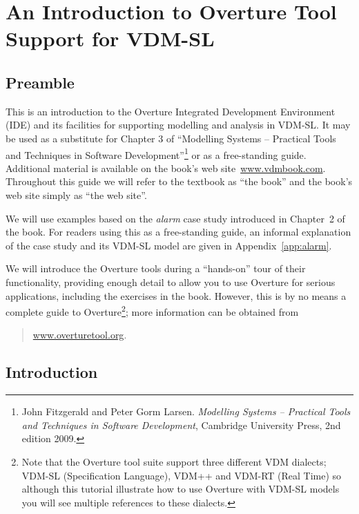 \chapter{An Introduction to Overture Tool Support for VDM-SL}\label{cha:toolbox}
\initexercise

\section*{Preamble}

This is an introduction to the Overture Integrated Development
Environment (IDE) and its facilities for supporting modelling and
analysis in VDM-SL. It may be used as a substitute for Chapter 3 of
``Modelling Systems -- Practical Tools and Techniques in Software
Development''\footnote{John Fitzgerald and Peter Gorm
  Larsen. \emph{Modelling Systems -- Practical Tools and Techniques in
    Software Development}, Cambridge University Press, 2nd edition
  2009.} or as a free-standing guide. Additional material is available
on the book's web site~\url{www.vdmbook.com}. Throughout this guide
  we will refer to the textbook as ``the book'' and the book's web
  site simply as ``the web site''.

We will use examples based on the \emph{alarm} case study introduced
in Chapter~2 of the book. For readers using this as a
free-standing guide, an informal explanation of the case study and its
VDM-SL model are given in Appendix~\ref{app:alarm}.

We will introduce the Overture tools during a ``hands-on'' tour of
their functionality, providing enough detail to allow you to use
Overture for serious applications, including the exercises in the
book. However, this is by no means a complete guide to
Overture\footnote{Note that the Overture tool suite support three
  different VDM dialects; VDM-SL (Specification Language), VDM++ and
  VDM-RT (Real Time) so although this tutorial illustrate how to use
  Overture with VDM-SL models you will see multiple references to
  these dialects.}; more
information can be obtained from
\begin{quote}
\url{www.overturetool.org}.
\end{quote}

\section{Introduction}

